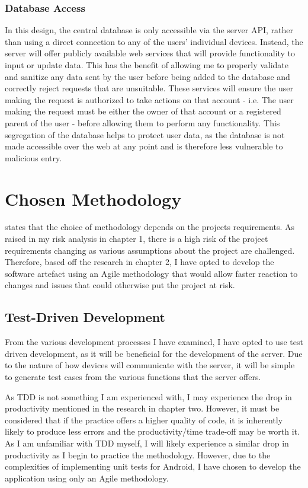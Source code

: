 \subsubsection{Database Access}
In this design, the central database is only accessible via the server API, rather than using a direct connection to any of the users' individual devices.
Instead, the server will offer publicly available web services that will provide functionality to input or update data. 
This has the benefit of allowing me to properly validate and sanitize any data sent by the user before being added to the database and correctly reject requests that are unsuitable. 
These services will ensure the user making the request is authorized to take actions on that account - i.e. The user making the request must be either the owner of that account or a registered parent of the user - before allowing them to perform any functionality.
This segregation of the database helps to protect user data, as the database is not made accessible over the web at any point and is therefore less vulnerable to malicious entry.

\section{Chosen Methodology}
\cite{balaji2012waterfall} states that the choice of methodology depends on the projects requirements.
As raised in my risk analysis in chapter 1, there is a high risk of the project requirements changing as various assumptions about the project are challenged.
Therefore, based off the research in chapter 2, I have opted to develop the software artefact using an Agile methodology that would allow faster reaction to changes and issues that could otherwise put the project at risk.

\subsection{Test-Driven Development}
From the various development processes I have examined, I have opted to use test driven development, as it will be beneficial for the development of the server.
Due to the nature of how devices will communicate with the server, it will be simple to generate test cases from the various functions that the server offers.

As TDD is not something I am experienced with, I may experience the drop in productivity mentioned in the research in chapter two.
However, it must be considered that if the practice offers a higher quality of code, it is inherently likely to produce less errors and the productivity/time trade-off may be worth it.
As I am unfamiliar with TDD myself, I will likely experience a similar drop in productivity as I begin to practice the methodology.
However, due to the complexities of implementing unit tests for Android, I have chosen to develop the application using only an Agile methodology.

